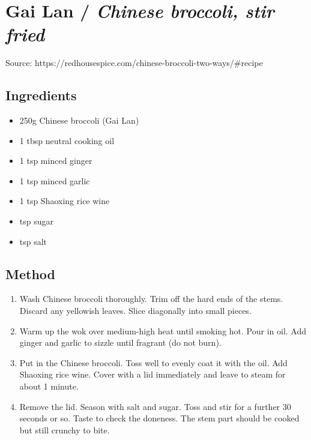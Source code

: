 \clearpage
\section{Gai Lan / \emph{Chinese broccoli, stir fried}}


Source: https://redhousespice.com/chinese-broccoli-two-ways/\#recipe

\subsection{Ingredients}

\begin{itemize}
    \item 250g Chinese broccoli (Gai Lan)
    \item 1 tbsp neutral cooking oil
    \item 1 tsp minced ginger
    \item 1 tsp minced garlic
    \item 1 tsp Shaoxing rice wine
    \item {} tsp sugar
    \item {} tsp salt
\end{itemize}

\subsection{Method}

\begin{enumerate}
    \item Wash Chinese broccoli thoroughly. Trim off the hard ends of the stems. Discard any yellowish leaves. Slice diagonally into small pieces.
    \item Warm up the wok over medium-high heat until smoking hot. Pour in oil. Add ginger and garlic to sizzle until fragrant (do not burn).
    \item Put in the Chinese broccoli. Toss well to evenly coat it with the oil. Add Shaoxing rice wine. Cover with a lid immediately and leave to steam for about 1 minute.
    \item Remove the lid. Season with salt and sugar. Toss and stir for a further 30 seconds or so. Taste to check the doneness. The stem part should be cooked but still crunchy to bite.
\end{enumerate}
